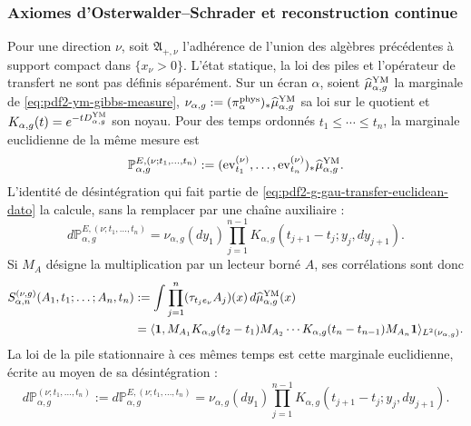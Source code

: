 \subsubsection{Axiomes d'Osterwalder--Schrader et reconstruction continue}

Pour une direction $\nu$, soit $\mathfrak A_{+,\nu}$ l’adhérence de l’union des
algèbres précédentes à support compact dans $\{x_\nu>0\}$. L’état
statique, la loi des piles et l’opérateur de transfert ne sont pas définis
séparément. Sur un écran $\alpha$, soient
$\widehat\mu_{\alpha,g}^{\rm YM}$ la marginale de
\eqref{eq:pdf2-ym-gibbs-measure},
$\nu_{\alpha,g}:=(\pi_\alpha^{\rm phys})_*
\widehat\mu_{\alpha,g}^{\rm YM}$ sa loi sur le quotient et
$K_{\alpha,g}(t)=e^{-tD_{\alpha,g}^{\rm YM}}$ son noyau.
Pour des temps ordonnés $t_1\le\cdots\le t_n$, la marginale euclidienne de la
même mesure est
\begin{equation}\label{eq:pdf2-ym-owner-euclidean-time-marginal}
 \mathbb P_{\alpha,g}^{E,(\nu;t_1,\ldots,t_n)}
 :=(\operatorname{ev}_{t_1}^{(\nu)},\ldots,
    \operatorname{ev}_{t_n}^{(\nu)})_*
    \widehat\mu_{\alpha,g}^{\rm YM}.
\end{equation}
L'identité de désintégration qui fait partie de \eqref{eq:pdf2-g-gau-transfer-euclidean-dato} la calcule, sans la remplacer par une chaîne auxiliaire :
\begin{equation}\label{eq:pdf2-ym-owner-euclidean-markov-identification}
 d\mathbb P_{\alpha,g}^{E,(\nu;t_1,\ldots,t_n)}
 =\nu_{\alpha,g}(dy_1)
   \prod_{j=1}^{n-1}K_{\alpha,g}
      (t_{j+1}-t_j;y_j,dy_{j+1}).
\end{equation}
Si $M_A$ désigne la multiplication par un lecteur borné $A$, ses corrélations
sont donc
\begin{equation}\label{eq:pdf2-ym-owner-schwinger-transfer}
 \begin{aligned}
 S_{\alpha,n}^{(\nu,g)}(A_1,t_1;\ldots;A_n,t_n)
 &:=\int\prod_{j=1}^n(\tau_{t_je_\nu}A_j)(x)\,
       d\widehat\mu_{\alpha,g}^{\rm YM}(x)\\
 &=\langle\mathbf1,
 M_{A_1}K_{\alpha,g}(t_2-t_1)M_{A_2}\cdots
 K_{\alpha,g}(t_n-t_{n-1})M_{A_n}\mathbf1
 \rangle_{L^2(\nu_{\alpha,g})}.
 \end{aligned}
\end{equation}
La loi de la pile stationnaire à ces mêmes temps est cette marginale euclidienne, écrite au moyen de sa désintégration :
\begin{equation}\label{eq:pdf2-ym-owner-markov-stack-law}
 d\mathbb P_{\alpha,g}^{(\nu;t_1,\ldots,t_n)}
 :=d\mathbb P_{\alpha,g}^{E,(\nu;t_1,\ldots,t_n)}
 =\nu_{\alpha,g}(dy_1)
   \prod_{j=1}^{n-1}K_{\alpha,g}(t_{j+1}-t_j;y_j,dy_{j+1}).
\end{equation}
